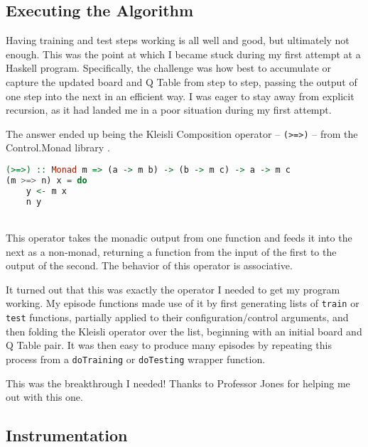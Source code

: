 \documentclass[12pt,a4paper]{article}
\begin{document}
		\subsection{Executing the Algorithm}
		
		\par Having training and test steps working is all well and good, but ultimately not enough. This was the point at which I became stuck during my first attempt at a Haskell program. Specifically, the challenge was how best to accumulate or capture the updated board and Q Table from step to step, passing the output of one step into the next in an efficient way. I was eager to stay away from explicit recursion, as it had landed me in a poor situation during my first attempt.
		\par The answer ended up being the Kleisli Composition operator -- \texttt{(>=>)} -- from the Control.Monad library \cite{kleisli}. \\
		
		\begin{lstlisting}[language=Haskell,numbers=none]
(>=>) :: Monad m => (a -> m b) -> (b -> m c) -> a -> m c
(m >=> n) x = do
	y <- m x
	n y
		\end{lstlisting}\ \\
		
		This operator takes the monadic output from one function and feeds it into the next as a non-monad, returning a function from the input of the first to the output of the second. The behavior of this operator is associative.
		\par It turned out that this was exactly the operator I needed to get my program working. My episode functions made use of it by first generating lists of \texttt{train} or \texttt{test} functions, partially applied to their configuration/control arguments, and then folding the Kleisli operator over the list, beginning with an initial board and Q Table pair. It was then easy to produce many episodes by repeating this process from a \texttt{doTraining} or \texttt{doTesting} wrapper function. 
		\par This was the breakthrough I needed! Thanks to Professor Jones for helping me out with this one.
		
		\subsection{Instrumentation}
		
\end{document}
